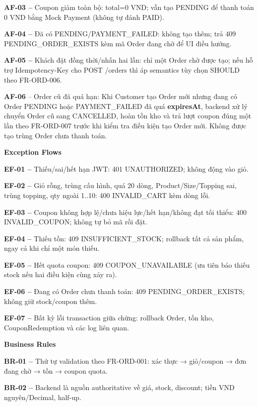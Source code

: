 \documentclass[11pt,a4paper,oneside]{report}
\begin{document}
\textbf{AF-03 --} Coupon giảm toàn bộ: total=0 VND; vẫn tạo PENDING để thanh toán 0 VND bằng Mock Payment (không tự đánh PAID).

\textbf{AF-04 --} Đã có PENDING/PAYMENT\_FAILED: không tạo thêm; trả 409 PENDING\_ORDER\_EXISTS kèm mã Order đang chờ để UI điều hướng.

\textbf{AF-05 --} Khách đặt đồng thời/nhấn hai lần: chỉ một Order chờ được tạo; nếu hỗ trợ Idempotency-Key cho POST /orders thì áp semantics tùy chọn SHOULD theo FR-ORD-006.

\textbf{AF-06} -- Order cũ đã quá hạn: Khi Customer tạo Order mới nhưng đang có Order PENDING hoặc PAYMENT\_FAILED đã quá \textbf{expiresAt}, backend xử lý chuyển Order cũ sang CANCELLED, hoàn tồn kho và trả lượt coupon đúng một lần theo FR-ORD-007 trước khi kiểm tra điều kiện tạo Order mới. Không được tạo trùng Order chưa thanh toán.
\par

\par\smallskip\noindent\textcolor{sgublue}{\textbf{Exception Flows}}\par\nobreak
\textbf{EF-01 --} Thiếu/sai/hết hạn JWT: 401 UNAUTHORIZED; không động vào giỏ.

\textbf{EF-02 --} Giỏ rỗng, trùng cấu hình, quá 20 dòng, Product/Size/Topping sai, trùng topping, qty ngoài 1..10: 400 INVALID\_CART kèm dòng lỗi.

\textbf{EF-03 --} Coupon không hợp lệ/chưa hiệu lực/hết hạn/không đạt tối thiểu: 400 INVALID\_COUPON; không tự bỏ mã rồi đặt.

\textbf{EF-04 --} Thiếu tồn: 409 INSUFFICIENT\_STOCK; rollback tất cả sản phẩm, ngay cả khi chỉ một món thiếu.

\textbf{EF-05 --} Hết quota coupon: 409 COUPON\_UNAVAILABLE (ưu tiên báo thiếu stock nếu hai điều kiện cùng xảy ra).

\textbf{EF-06 --} Đang có Order chưa thanh toán: 409 PENDING\_ORDER\_EXISTS; không giữ stock/coupon thêm.

\textbf{EF-07 --} Bất kỳ lỗi transaction giữa chừng: rollback Order, tồn kho, CouponRedemption và các log liên quan.
\par

\par\smallskip\noindent\textcolor{sgublue}{\textbf{Business Rules}}\par\nobreak
\textbf{BR-01 --} Thứ tự validation theo FR-ORD-001: xác thực → giỏ/coupon → đơn đang chờ → tồn → coupon quota.

\textbf{BR-02 --} Backend là nguồn authoritative về giá, stock, discount; tiền VND nguyên/Decimal, half-up.
\end{document}
